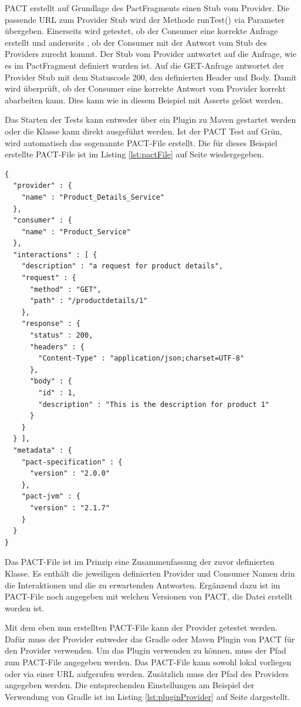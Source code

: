 \documentclass{llncs}
\begin{document}
PACT erstellt auf Grundlage des PactFragments einen Stub vom Provider. Die passende URL zum Provider Stub wird der Methode runTest() via Parameter übergeben. Einerseits wird getestet, ob der Consumer eine korrekte Anfrage erstellt und anderseits , ob der Consumer mit der Antwort vom Stub des Providers zurecht kommt. Der Stub vom Provider antwortet auf die Anfrage, wie es im PactFragment definiert wurden ist. Auf die GET-Anfrage antwortet der Provider Stub mit dem Statuscode 200, den definierten Header und Body. Damit wird überprüft, ob der Consumer eine korrekte Antwort vom Provider korrekt abarbeiten kann. Dies kann wie in diesem Beispiel mit Asserts gelöst werden.

Das Starten der Tests kann entweder über ein Plugin zu Maven gestartet werden oder die Klasse kann direkt ausgeführt werden. Ist der PACT Test auf Grün, wird automatisch das sogenannte PACT-File erstellt. Die für dieses Beispiel erstellte PACT-File ist im Listing \ref{lst:pactFile} auf Seite \pageref{lst:pactFile} wiedergegeben.
\lstset{language = Java}
\begin{lstlisting}[caption=PACT-File,label=lst:pactFile]
{
  "provider" : {
    "name" : "Product_Details_Service"
  },
  "consumer" : {
    "name" : "Product_Service"
  },
  "interactions" : [ {
    "description" : "a request for product details",
    "request" : {
      "method" : "GET",
      "path" : "/productdetails/1"
    },
    "response" : {
      "status" : 200,
      "headers" : {
        "Content-Type" : "application/json;charset=UTF-8"
      },
      "body" : {
        "id" : 1,
        "description" : "This is the description for product 1"
      }
    }
  } ],
  "metadata" : {
    "pact-specification" : {
      "version" : "2.0.0"
    },
    "pact-jvm" : {
      "version" : "2.1.7"
    }
  }
}
\end{lstlisting}

Das PACT-File ist im Prinzip eine Zusammenfassung der zuvor definierten Klasse. Es enthält die jeweiligen definierten Provider und Consumer Namen drin die Interaktionen und die zu erwartenden Antworten. Ergänzend dazu ist im PACT-File noch angegeben mit welchen Versionen von PACT, die Datei erstellt worden ist.

Mit dem eben nun erstellten PACT-File kann der Provider getestet werden. Dafür muss der Provider entweder das Gradle oder Maven Plugin von PACT für den Provider verwenden. Um das Plugin verwenden zu können, muss der Pfad zum PACT-File angegeben werden. Das PACT-File kann sowohl lokal vorliegen oder via einer URL aufgerufen werden. Zusätzlich muss der Pfad des Providers angegeben werden. Die entsprechenden Einstellungen am Beispiel der Verwendung von Gradle ist im Listing \ref{lst:pluginProvider} auf Seite \pageref{lst:pluginProvider} dargestellt.
\end{document}
